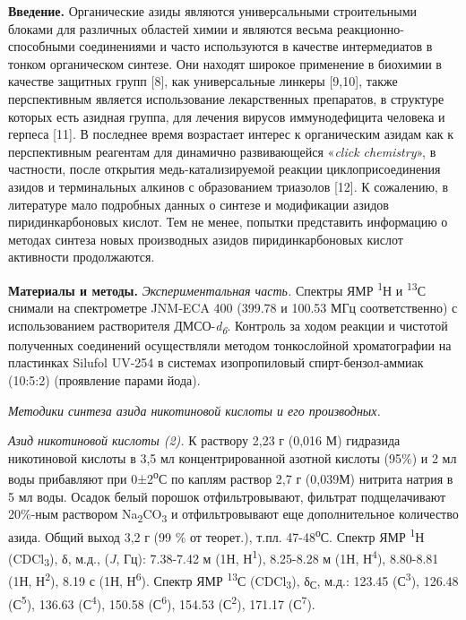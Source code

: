 {\bfseries Введение.} Органические азиды являются универсальными
строительными блоками для различных областей химии и являются весьма
реакционно-способными соединениями и часто используются в качестве
интермедиатов в тонком органическом синтезе. Они находят широкое
применение в биохимии в качестве защитных групп {[}8{]}, как
универсальные линкеры {[}9,10{]}, также перспективным является
использование лекарственных препаратов, в структуре которых есть азидная
группа, для лечения вирусов иммунодефицита человека и герпеса {[}11{]}.
В последнее время возрастает интерес к органическим азидам как к
перспективным реагентам для динамично развивающейся «\emph{click
chemistry}», в частности, после открытия медь-катализируемой реакции
циклоприсоединения азидов и терминальных алкинов с образованием
триазолов {[}12{]}. К сожалению, в литературе мало подробных данных о
синтезе и модификации азидов пиридинкарбоновых кислот. Тем не менее,
попытки представить информацию о методах синтеза новых производных
азидов пиридинкарбоновых кислот активности продолжаются.

{\bfseries Материалы и методы.} \emph{Экспериментальная часть.} Спектры ЯМР
\textsuperscript{1}Н и \textsuperscript{13}С снимали на спектрометре
JNM-ECA 400 (399.78 и 100.53 МГц соответственно) с использованием
растворителя ДМСО-\emph{d\textsubscript{6}}. Контроль за ходом реакции и
чистотой полученных соединений осуществляли методом тонкослойной
хроматографии на пластинках Silufol UV-254 в системах изопропиловый
спирт-бензол-аммиак (10:5:2) (проявление парами йода).

\emph{Методики синтеза азида никотиновой кислоты и его производных.}

\emph{Азид никотиновой кислоты (2).} К раствору 2,23 г (0,016 М)
гидразида никотиновой кислоты в 3,5 мл концентрированной азотной кислоты
(95\%) и 2 мл воды прибавляют при 0±2\textsuperscript{о}С по каплям
раствор 2,7 г (0,039М) нитрита натрия в 5 мл воды. Осадок белый порошок
отфильтровывают, фильтрат подщелачивают 20\%-ным раствором
Na\textsubscript{2}CO\textsubscript{3} и отфильтровывают еще
дополнительное количество азида. Общий выход 3,2 г (99 \% от теорет.),
т.пл. 47-48\textsuperscript{о}С. Спектр ЯМР \textsuperscript{1}Н
(CDCl\textsubscript{3}), δ, м.д., (\emph{J}, Гц): 7.38-7.42 м (1Н,
Н\textsuperscript{1}), 8.25-8.28 м (1Н, Н\textsuperscript{4}), 8.80-8.81
(1Н, Н\textsuperscript{2}), 8.19 с (1Н, Н\textsuperscript{6}). Спектр
ЯМР \textsuperscript{13}С (CDCl\textsubscript{3}), δ\textsubscript{С},
м.д.: 123.45 (С\textsuperscript{3}), 126.48 (С\textsuperscript{5}),
136.63 (С\textsuperscript{4}), 150.58 (С\textsuperscript{6}), 154.53
(С\textsuperscript{2}), 171.17 (С\textsuperscript{7}).

